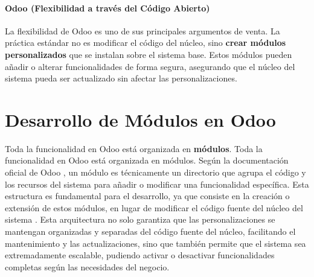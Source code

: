 \documentclass[12pt,letterpaper,spanish]{report}
\begin{document}
\paragraph{Odoo (Flexibilidad a través del Código Abierto)}
La flexibilidad de Odoo es uno de sus principales argumentos de venta. La práctica estándar no es modificar el código del núcleo, sino \textbf{crear módulos personalizados} que se instalan sobre el sistema base. Estos módulos pueden añadir o alterar funcionalidades de forma segura, asegurando que el núcleo del sistema pueda ser actualizado sin afectar las personalizaciones.

\section{Desarrollo de Módulos en Odoo}
\label{sec:desarrollo_modulos}

Toda la funcionalidad en Odoo está organizada en \textbf{módulos}. Toda la funcionalidad en Odoo está organizada en módulos. Según la documentación oficial de Odoo \citep{odooDocs}, un módulo es técnicamente un directorio que agrupa el código y los recursos del sistema para añadir o modificar una funcionalidad específica. Esta estructura es fundamental para el desarrollo, ya que consiste en la creación o extensión de estos módulos, en lugar de modificar el código fuente del núcleo del sistema \citep{reis2022odoo}. Esta arquitectura no solo garantiza que las personalizaciones se mantengan organizadas y separadas del código fuente del núcleo, facilitando el mantenimiento y las actualizaciones, sino que también permite que el sistema sea extremadamente escalable, pudiendo activar o desactivar funcionalidades completas según las necesidades del negocio.
\end{document}
